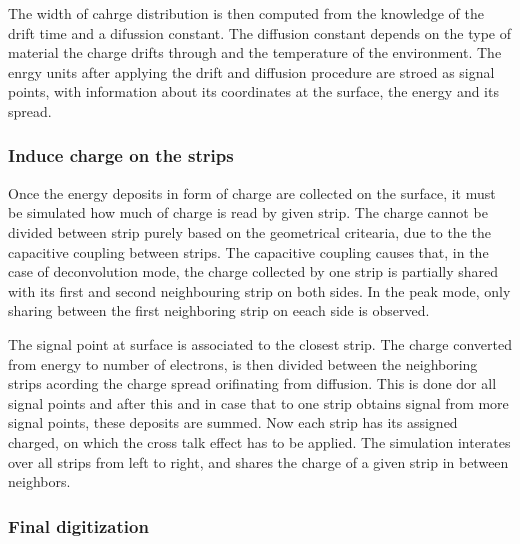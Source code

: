 The width of cahrge distribution is then computed from the knowledge of the drift time and a difussion constant. The diffusion constant depends on the type of material the charge drifts through and the temperature of the environment. The enrgy units after applying the drift and diffusion procedure are stroed as signal points, with information about its coordinates at the surface, the energy and its spread.


\subsubsection{Induce charge on the strips}

Once the energy deposits in form of charge are collected on the surface, it must be simulated how much of charge is read by given strip. The charge cannot be divided between strip purely based on the geometrical critearia, due to the the capacitive coupling between strips. The capacitive coupling causes that, in the case of deconvolution mode, the charge collected by one strip is partially shared with its first and second neighbouring strip on both sides. In the peak mode, only sharing between the first neighboring strip on eeach side is observed.   


The signal point at surface is associated to the closest strip. The charge converted from energy to number of electrons, is then divided between the neighboring strips acording the charge spread orifinating from diffusion. This is done dor all signal points and after this and in case that to one strip obtains signal from more signal points, these deposits are summed. Now each strip has its assigned charged, on which the cross talk effect has to be applied. The simulation interates over all strips from left to right, and shares the charge of a given strip in between neighbors.

\subsubsection{Final digitization}

